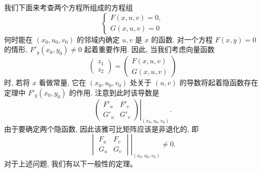 \documentclass[UTF8,12pt,a4paper,fontset=fandol]{ctexart}
\begin{document}
我们下面来考查两个方程所组成的方程组
\[
  \begin{cases}
    F(x,u,v)=0,\\
    G(x,u,v)=0
  \end{cases}
\]
何时能在 $(x_0,u_0,v_0)$ 的邻域内确定 $u,v$ 是 $x$ 的函数. 对一个方程 $F(x,y)=0$ 的情形, $F'_y(x_0,y_0)\ne0$ 起着重要作用. 因此, 当我们考虑向量函数
\[
  \begin{pmatrix}
    z_1\\
    z_2
  \end{pmatrix}
  =
  \begin{pmatrix}
    F(x,u,v)\\
    G(x,u,v)
  \end{pmatrix}
\]
时, 若将 $x$ 看做常量, 它在 $(x_0,u_0,v_0)$ 处关于 $(u,v)$ 的导数将起着隐函数存在定理中 $F'_y(x_0,y_0)$ 的作用. 注意到此时该导数是
\[
  \left.
  \begin{pmatrix}
    F'_u & F'_v\\
    G'_u & G'_v
  \end{pmatrix}
  \right|_{(x_0,u_0,v_0)}.
\]
由于要确定两个隐函数, 因此该雅可比矩阵应该是非退化的, 即
\[
  \left.
  \begin{vmatrix}
    F_u & F_v\\
    G_u & G_v
  \end{vmatrix}
  \right|_{(x_0,u_0,v_0)}\ne0.
\]
对于上述问题, 我们有以下一般性的定理。
\end{document}
